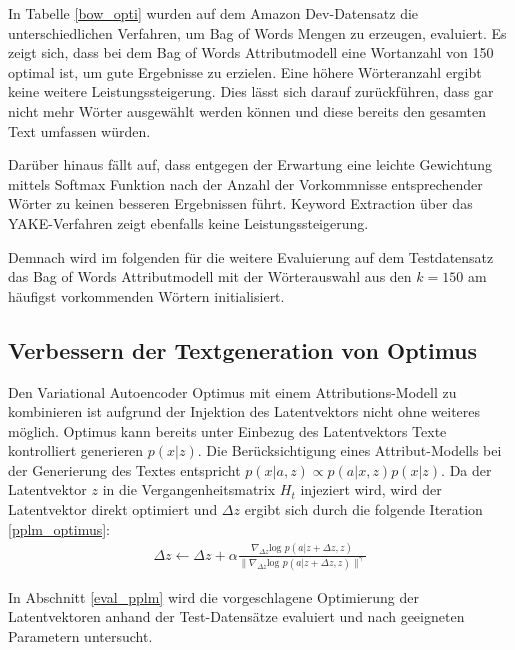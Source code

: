 In Tabelle \ref{bow_opti} wurden auf dem Amazon Dev-Datensatz die unterschiedlichen Verfahren, um Bag of Words Mengen zu erzeugen, evaluiert.
Es zeigt sich, dass bei dem Bag of Words Attributmodell eine Wortanzahl von 150 optimal ist, um gute Ergebnisse zu erzielen. 
Eine höhere Wörteranzahl ergibt keine weitere Leistungssteigerung. Dies lässt sich darauf zurückführen, dass gar nicht mehr Wörter ausgewählt werden können und diese bereits den gesamten Text umfassen würden.

Darüber hinaus fällt auf, dass entgegen der Erwartung eine leichte Gewichtung mittels Softmax Funktion nach der Anzahl der Vorkommnisse entsprechender Wörter zu keinen besseren Ergebnissen führt.
Keyword Extraction über das YAKE-Verfahren zeigt ebenfalls keine Leistungssteigerung. 

Demnach wird im folgenden für die weitere Evaluierung auf dem Testdatensatz das Bag of Words Attributmodell mit der Wörterauswahl aus den $k=150$ am häufigst vorkommenden Wörtern initialisiert.

\subsection{Verbessern der Textgeneration von Optimus}
Den Variational Autoencoder Optimus mit einem Attributions-Modell zu kombinieren ist aufgrund der Injektion des Latentvektors nicht ohne weiteres möglich.
Optimus kann bereits unter Einbezug des Latentvektors Texte kontrolliert generieren $p(x|z)$.
Die Berücksichtigung eines Attribut-Modells bei der Generierung des Textes entspricht $p(x|a,z) \propto p(a|x,z)p(x|z)$. %
Da der Latentvektor $z$ in die Vergangenheitsmatrix $H_t$ injeziert wird, wird der Latentvektor direkt optimiert und $\Delta z$ ergibt sich durch die folgende Iteration \ref{pplm_optimus}:
\begin{align}
    \label{pplm_optimus}
    \Delta z \leftarrow \Delta z + \alpha \frac{\nabla_{\Delta z} \text{log }p(a|z+\Delta z,z)}{\| \nabla_{\Delta z} \text{log }p(a|z+\Delta z,z)\|^\gamma}
\end{align}

In Abschnitt \ref*{eval_pplm} wird die vorgeschlagene Optimierung der Latentvektoren anhand der Test-Datensätze evaluiert und nach geeigneten Parametern untersucht.


